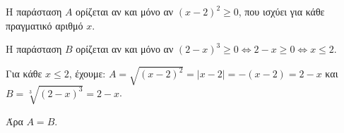 
\begin{alist}
\item Η παράσταση $A$ ορίζεται αν και μόνο αν $(x - 2)^2 \ge 0$, που ισχύει για κάθε πραγματικό
αριθμό $x$.

\item Η παράσταση $B$ ορίζεται αν και μόνο αν $(2 - x)^3 \ge 0 \Leftrightarrow 2 - x \ge 0 \Leftrightarrow x \le 2$.

\item Για κάθε $x \le 2$, έχουμε:
$A = \sqrt{(x - 2)^2} = |x - 2| = -(x - 2) = 2 - x$ και $B = \sqrt[3]{(2 - x)^3} = 2 - x$.

Άρα $A = B$.
\end{alist}

